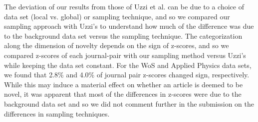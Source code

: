 \documentclass[11pt, oneside]{article}   	%
\begin{document}
The deviation of our results from those of Uzzi et al. can be due to a choice of data set (local vs. global) or sampling technique, and so we compared our sampling approach with Uzzi's to understand how much of the difference was due to the background data set versus the sampling technique. The categorization along the dimension of novelty depends on the sign of z-scores, and so we compared z-scores of each journal-pair with our sampling method versus Uzzi's while keeping  the data set constant.  For the WoS and Applied Physics data sets, we found that 2.8\% and 4.0\% of journal pair z-scores changed sign, respectively.  While this may induce a material effect on whether an article is deemed to be novel, it was apparent that most of the differences in z-scores were due to the background data set and so we did not comment further in the submission on the differences in sampling techniques.
\end{document}
